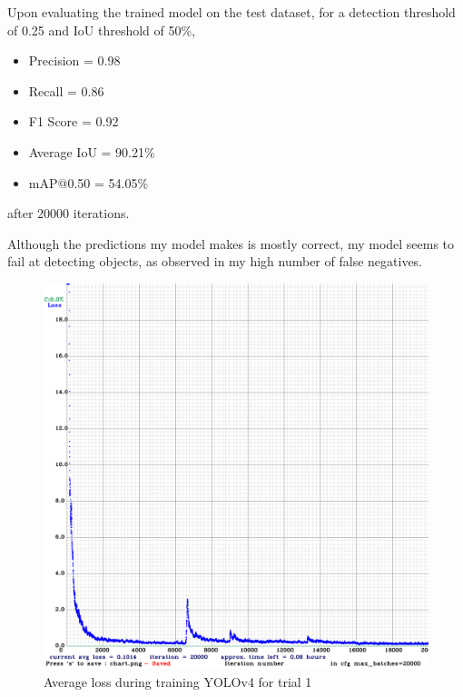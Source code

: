 \documentclass{article}
\begin{document}
            Upon evaluating the trained model on the test dataset, for a detection threshold of 0.25 and IoU threshold of 50\%,
            
            \begin{itemize}
                
                \item Precision = 0.98
                \item Recall = 0.86
                \item F1 Score = 0.92
                \item Average IoU = 90.21\%
                \item mAP@0.50 = 54.05\%
                
            \end{itemize}
        
            after 20000 iterations.
        
            Although the predictions my model makes is mostly correct, my model seems to fail at detecting objects, as observed in my high number of false negatives.
            
            \begin{figure}[h!]
                \centering
                \includegraphics[scale=0.4]{gtsdb_trial1}
                \caption{Average loss during training YOLOv4 for trial 1}
            \end{figure}
            
\end{document}

